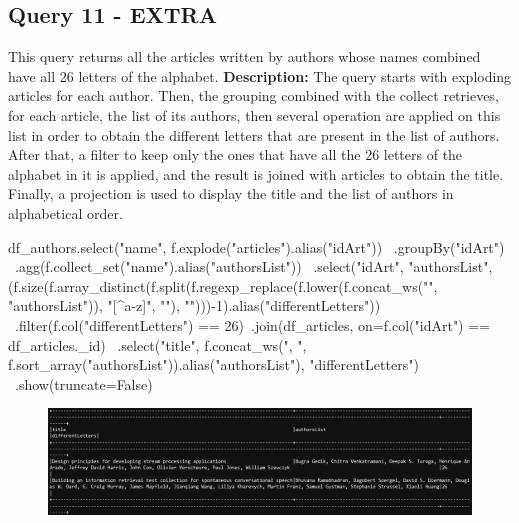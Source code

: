 \documentclass{Configuration_Files/PoliMi3i_thesis}
\begin{document}
\subsection{Query 11 - EXTRA}
This query returns all the articles written by authors whose names combined have all 26 letters of the alphabet.\newline
\textbf{Description:} The query starts with exploding articles for each author. Then, the grouping combined with the collect
retrieves, for each article, the list of its authors, then several operation are applied on this list in order to obtain the
different letters that are present in the list of authors. After that, a filter to keep only the ones that have all the 26
letters of the alphabet in it is applied, and the result is joined with articles to obtain the title. Finally, a projection is
used to display the title and the list of authors in alphabetical order.\newline
\begin{python}
df_authors.select("name", f.explode("articles").alias("idArt")) \
          .groupBy("idArt") \
          .agg(f.collect_set("name").alias("authorsList")) \
          .select("idArt", "authorsList", (f.size(f.array_distinct(f.split(f.regexp_replace(f.lower(f.concat_ws("", "authorsList")), "[^a-z]", ""), "")))-1).alias("differentLetters")) \
          .filter(f.col("differentLetters") == 26)\
          .join(df_articles, on=f.col("idArt") == df_articles._id) \
          .select("title", f.concat_ws(", ", f.sort_array("authorsList")).alias("authorsList"), "differentLetters") \
          .show(truncate=False)
\end{python}
\begin{figure}[H]
\centering
\includegraphics[width=1\textwidth]{query/spark_q11.PNG}
\label{fig:query11}
\end{figure}
\end{document}
